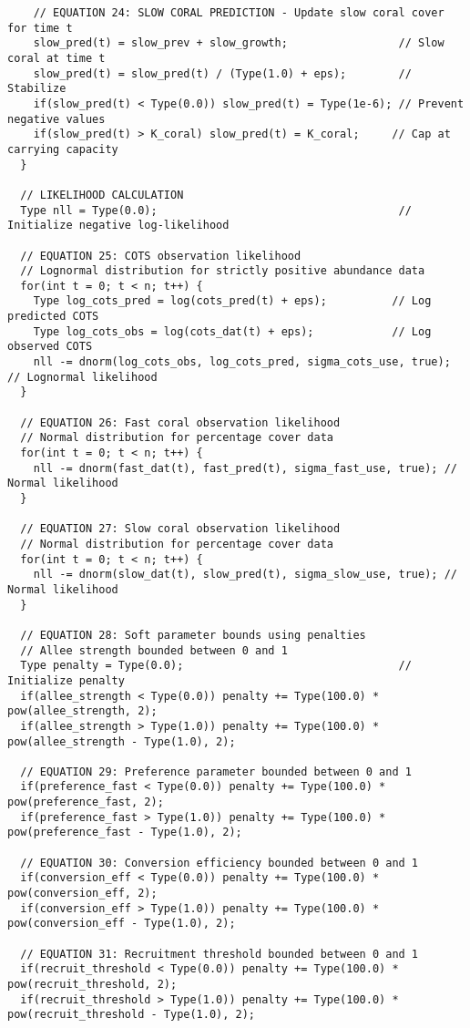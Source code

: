 \begin{lstlisting}
    // EQUATION 24: SLOW CORAL PREDICTION - Update slow coral cover for time t
    slow_pred(t) = slow_prev + slow_growth;                 // Slow coral at time t
    slow_pred(t) = slow_pred(t) / (Type(1.0) + eps);        // Stabilize
    if(slow_pred(t) < Type(0.0)) slow_pred(t) = Type(1e-6); // Prevent negative values
    if(slow_pred(t) > K_coral) slow_pred(t) = K_coral;     // Cap at carrying capacity
  }
  
  // LIKELIHOOD CALCULATION
  Type nll = Type(0.0);                                     // Initialize negative log-likelihood
  
  // EQUATION 25: COTS observation likelihood
  // Lognormal distribution for strictly positive abundance data
  for(int t = 0; t < n; t++) {
    Type log_cots_pred = log(cots_pred(t) + eps);          // Log predicted COTS
    Type log_cots_obs = log(cots_dat(t) + eps);            // Log observed COTS
    nll -= dnorm(log_cots_obs, log_cots_pred, sigma_cots_use, true); // Lognormal likelihood
  }
  
  // EQUATION 26: Fast coral observation likelihood
  // Normal distribution for percentage cover data
  for(int t = 0; t < n; t++) {
    nll -= dnorm(fast_dat(t), fast_pred(t), sigma_fast_use, true); // Normal likelihood
  }
  
  // EQUATION 27: Slow coral observation likelihood
  // Normal distribution for percentage cover data
  for(int t = 0; t < n; t++) {
    nll -= dnorm(slow_dat(t), slow_pred(t), sigma_slow_use, true); // Normal likelihood
  }
  
  // EQUATION 28: Soft parameter bounds using penalties
  // Allee strength bounded between 0 and 1
  Type penalty = Type(0.0);                                 // Initialize penalty
  if(allee_strength < Type(0.0)) penalty += Type(100.0) * pow(allee_strength, 2);
  if(allee_strength > Type(1.0)) penalty += Type(100.0) * pow(allee_strength - Type(1.0), 2);
  
  // EQUATION 29: Preference parameter bounded between 0 and 1
  if(preference_fast < Type(0.0)) penalty += Type(100.0) * pow(preference_fast, 2);
  if(preference_fast > Type(1.0)) penalty += Type(100.0) * pow(preference_fast - Type(1.0), 2);
  
  // EQUATION 30: Conversion efficiency bounded between 0 and 1
  if(conversion_eff < Type(0.0)) penalty += Type(100.0) * pow(conversion_eff, 2);
  if(conversion_eff > Type(1.0)) penalty += Type(100.0) * pow(conversion_eff - Type(1.0), 2);
  
  // EQUATION 31: Recruitment threshold bounded between 0 and 1
  if(recruit_threshold < Type(0.0)) penalty += Type(100.0) * pow(recruit_threshold, 2);
  if(recruit_threshold > Type(1.0)) penalty += Type(100.0) * pow(recruit_threshold - Type(1.0), 2);
  

\end{lstlisting}
